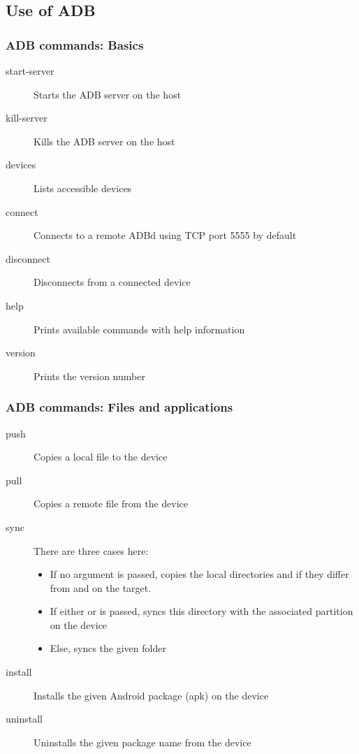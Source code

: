 \subsection{Use of ADB}
\begin{frame}
  \frametitle{ADB commands: Basics}
  \begin{description}
  \item[start-server] Starts the ADB server on the host
  \item[kill-server] Kills the ADB server on the host
  \item[devices] Lists accessible devices
  \item[connect] Connects to a remote ADBd using TCP port
    5555 by default
  \item[disconnect] Disconnects from a connected device
  \item[help] Prints available commands with help information
  \item[version] Prints the version number
  \end{description}
\end{frame}

\begin{frame}
  \frametitle{ADB commands: Files and applications}
  \begin{description}
  \item[push] Copies a local file to the device
  \item[pull] Copies a remote file from the device
  \item[sync] There are three cases here:
    \begin{itemize}
    \item If no argument is passed, copies the local directories
       and  if they differ from 
      and  on the target.
    \item If either  or  is passed, syncs this
      directory with the associated partition on the device
    \item Else, syncs the given folder
    \end{itemize}
  \item[install] Installs the given Android package (apk) on the device
  \item[uninstall] Uninstalls the given package name from the device
  \end{description}
\end{frame}

